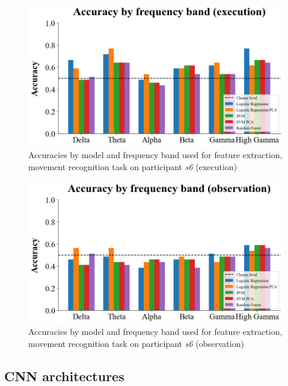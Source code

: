 \documentclass[10pt,conference,compsocconf]{IEEEtran}
\begin{document}
\begin{figure}[h!]
    \center
    \includegraphics[width=\linewidth]{../Code/figures/s6_accuracies_ex_freq_bands.png}
    \caption{Accuracies by model and frequency band used for feature extraction, movement recognition task on participant \textit{s6} (execution)}
    \label{appfig:accuracies_ex_freq_bands}
\end{figure}
\FloatBarrier

\begin{figure}[h!]
    \center
    \includegraphics[width=\linewidth]{../Code/figures/s6_accuracies_obs_freq_bands.png}
    \caption{Accuracies by model and frequency band used for feature extraction, movement recognition task on participant \textit{s6} (observation)}
    \label{appfig:accuracies_obs_freq_bands}
\end{figure}
\FloatBarrier

\subsection{CNN architectures}
\label{subsec:cnnarchi}
\end{document}
